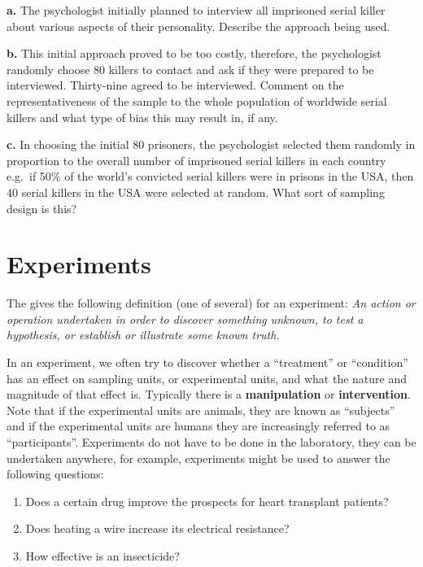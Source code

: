 \documentclass[
  oneside]{krantz}
\providecommand{\tightlist}{%
  \setlength{\itemsep}{0pt}\setlength{\parskip}{0pt}}
\begin{document}
\textbf{a.} The psychologist initially planned to interview all imprisoned serial killer about various aspects of their personality. Describe the approach being used.

\textbf{b.} This initial approach proved to be too costly, therefore, the psychologist randomly choose 80 killers to contact and ask if they were prepared to be interviewed. Thirty-nine agreed to be interviewed. Comment on the representativeness of the sample to the whole population of worldwide serial killers and what type of bias this may result in, if any.

\textbf{c.} In choosing the initial 80 prisoners, the psychologist selected them randomly in proportion to the overall number of imprisoned serial killers in each country e.g.~if 50\% of the world's convicted serial killers were in prisons in the USA, then 40 serial killers in the USA were selected at random. What sort of sampling design is this?

\hypertarget{experiments}{%
\section{Experiments}\label{experiments}}

The \citep{dictionary1980oxford} gives the following definition (one of several) for an experiment: \emph{An action or operation undertaken in order to discover something unknown, to test a hypothesis, or establish or illustrate some known truth.}

In an experiment, we often try to discover whether a ``treatment'' or ``condition'' has an effect on sampling units, or experimental units, and what the nature and magnitude of that effect is. Typically there is a \textbf{manipulation} or \textbf{intervention}. Note that if the experimental units are animals, they are known as ``subjects'' and if the experimental units are humans they are increasingly referred to as ``participants''. Experiments do not have to be done in the laboratory, they can be undertaken anywhere, for example, experiments might be used to answer the following questions:

\begin{enumerate}
\def\labelenumi{\arabic{enumi}.}
\tightlist
\item
  Does a certain drug improve the prospects for heart transplant patients?
\item
  Does heating a wire increase its electrical resistance?
\item
  How effective is an insecticide?
\end{enumerate}
\end{document}
